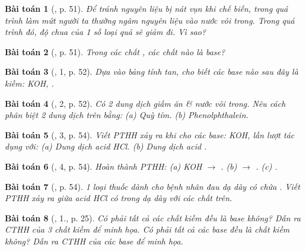 \documentclass{article}
\newtheorem{baitoan}{Bài toán}
\begin{document}
\begin{baitoan}[\cite{SGK_KHTN_8_Canh_Dieu}, p. 51]
	Để tránh nguyên liệu bị nát vụn khi chế biến, trong quá trình làm mứt người ta thường ngâm nguyên liệu vào nước vôi trong. Trong quá trình đó, độ chua của 1 số loại quả sẽ giảm đi. Vì sao?
\end{baitoan}

\begin{baitoan}[\cite{SGK_KHTN_8_Canh_Dieu}, p. 51]
	Trong các chất \emph{}, các chất nào là base?
\end{baitoan}

\begin{baitoan}[\cite{SGK_KHTN_8_Canh_Dieu}, 1, p. 52]
	Dựa vào bảng tính tan, cho biết các base nào sau đây là kiềm: \emph{KOH, }.
\end{baitoan}

\begin{baitoan}[\cite{SGK_KHTN_8_Canh_Dieu}, 2, p. 52]
	Có 2 dung dịch giấm ăn \& nước vôi trong. Nêu cách phân biệt 2 dung dịch trên bằng: (a) Quỳ tím. (b) Phenolphthalein.
\end{baitoan}

\begin{baitoan}[\cite{SGK_KHTN_8_Canh_Dieu}, 3, p. 54]
	Viết PTHH xảy ra khi cho các base: \emph{KOH, } lần lượt tác dụng với: (a) Dung dịch acid \emph{HCl}. (b) Dung dịch acid \emph{}.
\end{baitoan}

\begin{baitoan}[\cite{SGK_KHTN_8_Canh_Dieu}, 4, p. 54]
	Hoàn thành PTHH: (a) \emph{KOH $\to$ }. (b) \emph{ $\to$ }. (c) \emph{}.
\end{baitoan}

\begin{baitoan}[\cite{SGK_KHTN_8_Canh_Dieu}, p. 54]
	1 loại thuốc dành cho bệnh nhân đau dạ dày có chứa \emph{}. Viết PTHH xảy ra giữa acid \emph{HCl} có trong dạ dày với các chất trên.
\end{baitoan}

\begin{baitoan}[\cite{SGK_Hoa_Hoc_9}, 1., p. 25]
	Có phải tất cả các chất kiềm đều là base không? Dẫn ra CTHH của 3 chất kiềm để minh họa. Có phải tất cả các base đều là chất kiềm không? Dẫn ra CTHH của các base để minh họa.
\end{baitoan}
\end{document}

